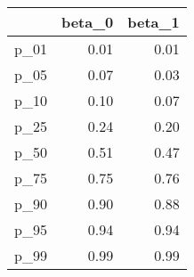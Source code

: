 \begin{table}[ht]
\centering
\begin{tabular}{rrr}
  \hline
 & beta\_0 & beta\_1 \\
  \hline
p\_01 & 0.01 & 0.01 \\
  p\_05 & 0.07 & 0.03 \\
  p\_10 & 0.10 & 0.07 \\
  p\_25 & 0.24 & 0.20 \\
  p\_50 & 0.51 & 0.47 \\
  p\_75 & 0.75 & 0.76 \\
  p\_90 & 0.90 & 0.88 \\
  p\_95 & 0.94 & 0.94 \\
  p\_99 & 0.99 & 0.99 \\
   \hline
\end{tabular}
\end{table}
